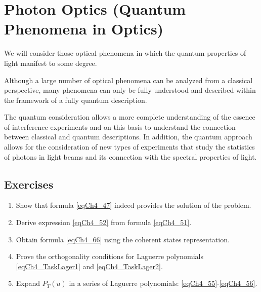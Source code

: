 \chapter{Photon Optics (Quantum Phenomena in Optics)}
\label{chOptic}
We will consider those optical phenomena in which the quantum properties of light manifest to some degree.

Although a large number of optical phenomena can be analyzed from a classical perspective, many phenomena can only be fully understood and described within the framework of a fully quantum description.

The quantum consideration allows a more complete understanding of the essence of interference experiments and on this basis to understand the connection between classical and quantum descriptions. In addition, the quantum approach allows for the consideration of new types of experiments that study the statistics of photons in light beams and its connection with the spectral properties of light.












\section{Exercises}
\begin{enumerate}
\item Show that formula \eqref{eqCh4_47} indeed provides the solution of the problem.
\item Derive expression \eqref{eqCh4_52} from formula \eqref{eqCh4_51}.
\item Obtain formula \eqref{eqCh4_66} using the coherent states representation.
\item Prove the orthogonality conditions for Laguerre polynomials \eqref{eqCh4_TaskLager1} and \eqref{eqCh4_TaskLager2}.
\item Expand $P_T\left(u\right)$ in a series of Laguerre polynomials: \eqref{eqCh4_55}-\eqref{eqCh4_56}.
\end{enumerate}

